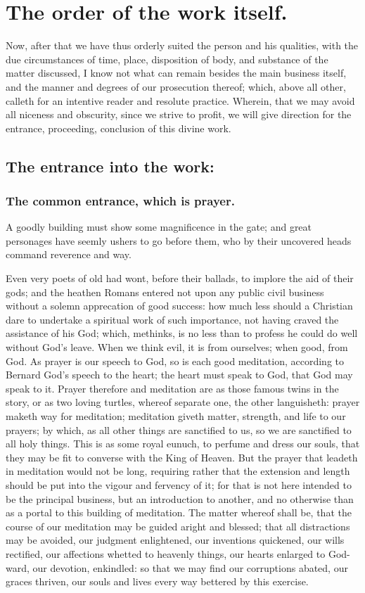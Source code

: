 \chapter{The order of the work itself.}
Now, after that we have thus orderly suited the person and his qualities, with the due circumstances of time, place, disposition of body, and substance of the matter discussed, I know not what can remain besides the main business itself, and the manner and degrees of our prosecution thereof; which, above all other, calleth for an intentive reader and resolute practice. Wherein, that we may avoid all niceness and obscurity, since we strive to profit, we will give direction for the entrance, proceeding, conclusion of this 
divine work. 

\section{The entrance into the work:}
\subsection{The common entrance, which is prayer.}
A goodly building must show some magnificence in the gate; and great personages have seemly ushers to go before them, who by their uncovered heads command reverence and way. 

Even very poets of old had wont, before their ballads, to implore the aid of their gods; and the heathen Romans entered not upon any public civil business without a solemn apprecation of good success: how much less should a Christian dare to undertake a spiritual work of such importance, not having craved the assistance of his God; which, methinks, is no less than to profess he could do well without God's leave. When we think evil, it is from ourselves; when good, from God. As prayer is our speech to God, so is each good meditation, according to Bernard God's speech to the heart; the heart must speak to God, that God may speak to it. Prayer therefore and meditation are as those famous twins in the story, or as two loving turtles, whereof separate one, the other languisheth: prayer maketh way for meditation; meditation giveth matter, strength, and life to our prayers; by which, as all other things are sanctified to us, so we are sanctified to all holy things. This is as some royal eunuch, to perfume and dress our souls, that they may be fit to converse with the King of Heaven. But the prayer that leadeth in meditation would not be long, requiring rather that the extension and length should be put into the vigour and fervency of it; for that is not here intended to be the principal business, but an introduction to another, and no otherwise than as a portal to this building of meditation. The matter whereof shall be, that the course of our meditation may be guided aright and blessed; that all distractions may be avoided, our judgment enlightened, our inventions quickened, our wills rectified, our affections whetted to heavenly things, our hearts enlarged to God-ward, our devotion, enkindled: so that we may find our corruptions abated, our graces thriven, our souls and lives every way bettered by this exercise. 

